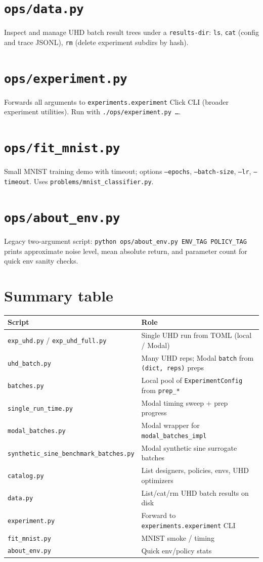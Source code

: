 \documentclass[11pt]{article}
\begin{document}
\section{\texttt{ops/data.py}}
Inspect and manage UHD batch result trees under a \texttt{results-dir}: \texttt{ls}, \texttt{cat} (config and trace JSONL), \texttt{rm} (delete experiment subdirs by hash).

\section{\texttt{ops/experiment.py}}
Forwards all arguments to \texttt{experiments.experiment} Click CLI (broader experiment utilities). Run with \texttt{./ops/experiment.py \dots}.

\section{\texttt{ops/fit\_mnist.py}}
Small MNIST training demo with timeout; options \texttt{--epochs}, \texttt{--batch-size}, \texttt{--lr}, \texttt{--timeout}. Uses \texttt{problems/mnist\_classifier.py}.

\section{\texttt{ops/about\_env.py}}
Legacy two-argument script: \texttt{python ops/about\_env.py ENV\_TAG POLICY\_TAG} prints approximate noise level, mean absolute return, and parameter count for quick env sanity checks.

\section{Summary table}
\begin{center}
\begin{tabular}{ll}
\hline
Script & Role \\
\hline
\texttt{exp\_uhd.py} / \texttt{exp\_uhd\_full.py} & Single UHD run from TOML (local / Modal) \\
\texttt{uhd\_batch.py} & Many UHD reps; Modal \texttt{batch} from \texttt{(dict, reps)} preps \\
\texttt{batches.py} & Local pool of \texttt{ExperimentConfig} from \texttt{prep\_*} \\
\texttt{single\_run\_time.py} & Modal timing sweep + prep progress \\
\texttt{modal\_batches.py} & Modal wrapper for \texttt{modal\_batches\_impl} \\
\texttt{synthetic\_sine\_benchmark\_batches.py} & Modal synthetic sine surrogate batches \\
\texttt{catalog.py} & List designers, policies, envs, UHD optimizers \\
\texttt{data.py} & List/cat/rm UHD batch results on disk \\
\texttt{experiment.py} & Forward to \texttt{experiments.experiment} CLI \\
\texttt{fit\_mnist.py} & MNIST smoke / timing \\
\texttt{about\_env.py} & Quick env/policy stats \\
\hline
\end{tabular}
\end{center}
\end{document}
